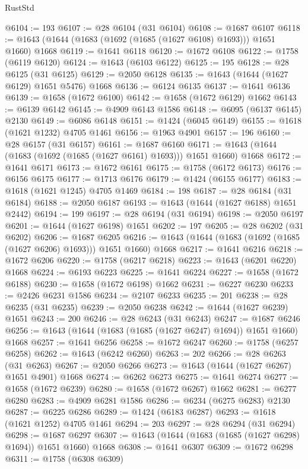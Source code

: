 \begin{lexlean}{RustStd}
\begin{coremodule}
@6104 := 193
@6107 := @28 @6104 (@31 @6104)
@6108 := @1687 @6107
@6118 := @1643 (@1644 (@1683 (@1692 (@1685 (@1627 @6108) @1693))) @1651 @1660) @1668
@6119 := @1641 @6118
@6120 := @1672 @6108
@6122 := @1758 (@6119 @6120)
@6124 := @1643 (@6103 @6122)
@6125 := 195
@6128 := @28 @6125 (@31 @6125)
@6129 := @2050 @6128
@6135 := @1643 (@1644 (@1627 @6129) @1651 @5476) @1668
@6136 := @6124 @6135
@6137 := @1641 @6136
@6139 := @1658 (@1672 @6100)
@6142 := @1658 (@1672 @6129) @1662
@6143 := @6139 @6142
@6145 := @4909 @6143 @1586
@6148 := @6095 (@6137 @6145) @2130
@6149 := @6086 @6148
@6151 := @1424 (@6045 @6149)
@6155 := @1618 (@1621 @1232) @4705 @1461
@6156 := @1963 @4901
@6157 := 196
@6160 := @28 @6157 (@31 @6157)
@6161 := @1687 @6160
@6171 := @1643 (@1644 (@1683 (@1692 (@1685 (@1627 @6161) @1693))) @1651 @1660) @1668
@6172 := @1641 @6171
@6173 := @1672 @6161
@6175 := @1758 (@6172 @6173)
@6176 := @6156 @6175
@6177 := @1713 @6176
@6179 := @1424 (@6155 @6177)
@6183 := @1618 (@1621 @1245) @4705 @1469
@6184 := 198
@6187 := @28 @6184 (@31 @6184)
@6188 := @2050 @6187
@6193 := @1643 (@1644 (@1627 @6188) @1651 @2442)
@6194 := 199
@6197 := @28 @6194 (@31 @6194)
@6198 := @2050 @6197
@6201 := @1644 (@1627 @6198) @1651
@6202 := 197
@6205 := @28 @6202 (@31 @6202)
@6206 := @1687 @6205
@6216 := @1643 (@1644 (@1683 (@1692 (@1685 (@1627 @6206) @1693))) @1651 @1660) @1668
@6217 := @1641 @6216
@6218 := @1672 @6206
@6220 := @1758 (@6217 @6218)
@6223 := @1643 (@6201 @6220) @1668
@6224 := @6193 @6223
@6225 := @1641 @6224
@6227 := @1658 (@1672 @6188)
@6230 := @1658 (@1672 @6198) @1662
@6231 := @6227 @6230
@6233 := @2426 @6231 @1586
@6234 := @2107 @6233
@6235 := 201
@6238 := @28 @6235 (@31 @6235)
@6239 := @2050 @6238
@6242 := @1644 (@1627 @6239) @1651
@6243 := 200
@6246 := @28 @6243 (@31 @6243)
@6247 := @1687 @6246
@6256 := @1643 (@1644 (@1683 (@1685 (@1627 @6247) @1694)) @1651 @1660) @1668
@6257 := @1641 @6256
@6258 := @1672 @6247
@6260 := @1758 (@6257 @6258)
@6262 := @1643 (@6242 @6260)
@6263 := 202
@6266 := @28 @6263 (@31 @6263)
@6267 := @2050 @6266
@6273 := @1643 (@1644 (@1627 @6267) @1651 @4901) @1668
@6274 := @6262 @6273
@6275 := @1641 @6274
@6277 := @1658 (@1672 @6239)
@6280 := @1658 (@1672 @6267) @1662
@6281 := @6277 @6280
@6283 := @4909 @6281 @1586
@6286 := @6234 (@6275 @6283) @2130
@6287 := @6225 @6286
@6289 := @1424 (@6183 @6287)
@6293 := @1618 (@1621 @1252) @4705 @1461
@6294 := 203
@6297 := @28 @6294 (@31 @6294)
@6298 := @1687 @6297
@6307 := @1643 (@1644 (@1683 (@1685 (@1627 @6298) @1694)) @1651 @1660) @1668
@6308 := @1641 @6307
@6309 := @1672 @6298
@6311 := @1758 (@6308 @6309)

\end{coremodule}
\end{lexlean}
